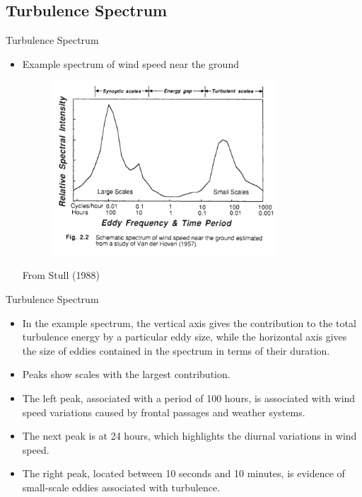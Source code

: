 \subsection{Turbulence Spectrum}
\begin{frame}{Turbulence Spectrum}
\begin{itemize}
  	\item Example spectrum of wind speed near the ground
  	\begin{figure}
  		\includegraphics[width=0.8\textwidth]{spectrum}
  	\end{figure}
  	\centering \tiny{From Stull (1988)} 
  \end{itemize}
\end{frame}
\begin{frame}{Turbulence Spectrum}
\begin{itemize}
  	\item In the example spectrum, the vertical axis gives the contribution to the total turbulence energy by a particular eddy size, while the horizontal axis gives the size of eddies contained in the spectrum in terms of their duration.
  	\item Peaks show scales with the largest contribution.
  	\item The left peak, associated with a period of 100 hours, is associated with wind speed variations caused by frontal passages and weather systems.
  	\item The next peak is at 24 hours, which highlights the diurnal variations in wind speed.
  	\item The right peak, located between 10 seconds and 10 minutes, is evidence of small-scale eddies associated with turbulence.
  \end{itemize}
\end{frame}
